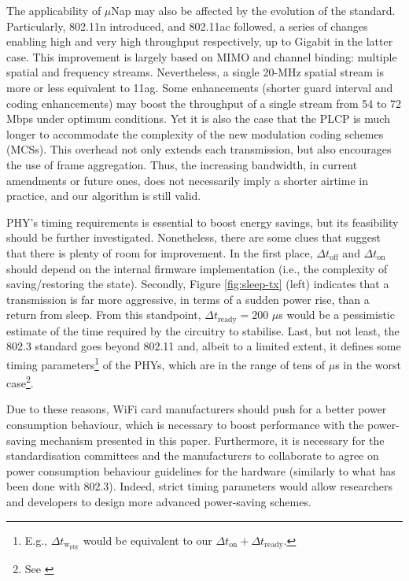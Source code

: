 \documentclass[twoside,nohyper]{tufte-book}
\begin{document}
The applicability of \(\mu\)Nap may also be affected by the evolution of the standard. Particularly, 802.11n introduced, and 802.11ac followed, a series of changes enabling high and very high throughput respectively, up to Gigabit in the latter case. This improvement is largely based on MIMO and channel binding: multiple spatial and frequency streams. Nevertheless, a single 20-MHz spatial stream is more or less equivalent to 11ag. Some enhancements (shorter guard interval and coding enhancements) may boost the throughput of a single stream from 54 to 72 Mbps under optimum conditions. Yet it is also the case that the PLCP is much longer to accommodate the complexity of the new modulation coding schemes (MCSs). This overhead not only extends each transmission, but also encourages the use of frame aggregation. Thus, the increasing bandwidth, in current amendments or future ones, does not necessarily imply a shorter airtime in practice, and our algorithm is still valid.

 PHY's timing requirements is essential to boost energy savings, but its feasibility should be further investigated. Nonetheless, there are some clues that suggest that there is plenty of room for improvement. In the first place, \(\Delta t_\mathrm{off}\) and \(\Delta t_\mathrm{on}\) should depend on the internal firmware implementation (i.e., the complexity of saving/restoring the state). Secondly, Figure \ref{fig:sleep-tx} (left) indicates that a transmission is far more aggressive, in terms of a sudden power rise, than a return from sleep. From this standpoint, \(\Delta t_\mathrm{ready} = 200\) \(\mu\)s would be a pessimistic estimate of the time required by the circuitry to stabilise. Last, but not least, the 802.3 standard goes beyond 802.11 and, albeit to a limited extent, it defines some timing parameters\footnote{E.g., \(\Delta t_\mathrm{w_{phy}}\) would be equivalent to our \(\Delta t_\mathrm{on}+\Delta t_\mathrm{ready}\).} of the PHYs, which are in the range of tens of \(\mu\)s in the worst case\footnote{See \citet[Table 78-4]{8023}}.

Due to these reasons, WiFi card manufacturers should push for a better power consumption behaviour, which is necessary to boost performance with the power-saving mechanism presented in this paper. Furthermore, it is necessary for the standardisation committees and the manufacturers to collaborate to agree on power consumption behaviour guidelines for the hardware (similarly to what has been done with 802.3). Indeed, strict timing parameters would allow researchers and developers to design more advanced power-saving schemes.
\end{document}
